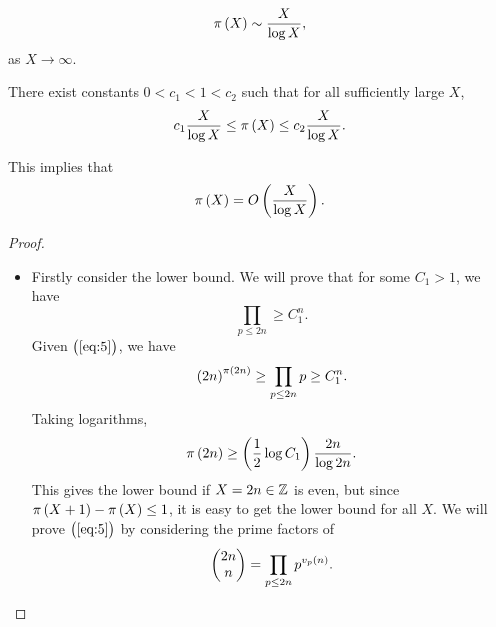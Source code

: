 \begin{theorem}
$$ \pi\br{X} \sim \dfrac{X}{\log X}, $$
as $ X \to \infty $.
\end{theorem}

\begin{theorem}
There exist constants $ 0 < c_1 < 1 < c_2 $ such that for all sufficiently large $ X $,
$$ c_1\dfrac{X}{\log X} \le \pi\br{X} \le c_2\dfrac{X}{\log X}. $$
\end{theorem}

This implies that
$$ \pi\br{X} = O\br{\dfrac{X}{\log X}}. $$


\begin{proof}
\hfill
\begin{itemize}
\item Firstly consider the lower bound. We will prove that for some $ C_1 > 1 $, we have
\begin{equation}
\label{eq:5}
\prod_{p \le 2n} \ge C_1^n.
\end{equation}
Given $ \br{\ref{eq:5}} $, we have
$$ \br{2n}^{\pi\br{2n}} \ge \prod_{p \le 2n} p \ge C_1^n. $$
Taking logarithms,
$$ \pi\br{2n} \ge \br{\dfrac{1}{2}\log C_1}\dfrac{2n}{\log 2n}. $$
This gives the lower bound if $ X = 2n \in \mathbb{Z} $ is even, but since $ \pi\br{X + 1} - \pi\br{X} \le 1 $, it is easy to get the lower bound for all $ X $. We will prove $ \br{\ref{eq:5}} $ by considering the prime factors of
$$ \twobyone{2n}{n} = \prod_{p \le 2n} p^{v_p\br{n}}. $$

\pagebreak


\end{itemize}
\end{proof}
